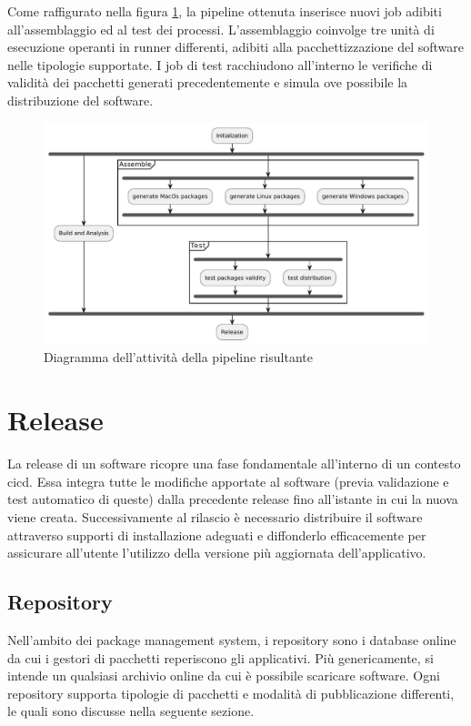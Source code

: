 Come raffigurato nella figura \ref{fig:pipeline-activity-diagram}, la pipeline ottenuta inserisce nuovi job adibiti all'assemblaggio ed al test dei processi. L'assemblaggio coinvolge tre unità di esecuzione operanti in runner differenti, adibiti alla pacchettizzazione del software nelle tipologie supportate. I job di test racchiudono all'interno le verifiche di validità dei pacchetti generati precedentemente e simula ove possibile la distribuzione del software.
\begin{figure}[htb]
	\centering
	\includegraphics[width=1\linewidth]{figures/pipeline-result.pdf}
	\caption{Diagramma dell'attività della pipeline risultante}
	\label{fig:pipeline-activity-diagram}
\end{figure}
\newpage
\section{Release}
La release di un software ricopre una fase fondamentale all'interno di un contesto \ac{cicd}. Essa integra tutte le modifiche apportate al software (previa validazione e test automatico di queste) dalla precedente release fino all'istante in cui la nuova viene creata. Successivamente al rilascio è necessario distribuire il software attraverso supporti di installazione adeguati e diffonderlo efficacemente per assicurare all'utente l'utilizzo della versione più aggiornata dell'applicativo.

\subsection{Repository}
Nell'ambito dei package management system, i repository sono i database online da cui i gestori di pacchetti reperiscono gli applicativi. Più genericamente, si intende un qualsiasi archivio online da cui è possibile scaricare software. Ogni repository supporta tipologie di pacchetti e modalità di pubblicazione differenti, le quali sono discusse nella seguente sezione.

